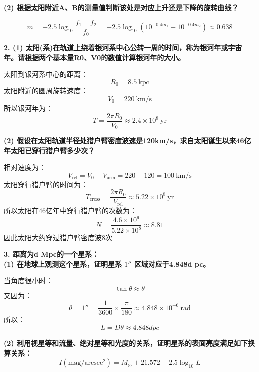 \documentclass{ctexart}
\begin{document}
\vspace{0.5em}

\noindent\textbf{(2) 根据太阳附近A、B的测量值判断该处是对应上升还是下降的旋转曲线？}

\vspace{0.25em}
\[m = -2.5 \log_{10}\frac{f_1 + f_2}{f_0} = -2.5 \log_{10}(10^{-0.4 m_1} + 10^{-0.4 m_2}) \approx 0.638\]
\vspace{0.5em}

\noindent\textbf{2. (1) 太阳(系)在轨道上绕着银河系中心公转一周的时间，称为银河年或宇宙年。请根据两个基本量R0、V0的数值计算银河年的大小。}

\vspace{0.25em}
\noindent 太阳到银河系中心的距离：
\[R_0 = 8.5\ \mathrm{kpc}\]
太阳附近的圆周旋转速度：
\[V_0 = 220\ \mathrm{km/s}\]
所以银河年为：
\[T = \frac{2 \pi R_0}{V_0} \approx 2.4 \times 10^8\ \mathrm{yr}\]
\vspace{0.5em}

\noindent\textbf{(2) 假设在太阳轨道半径处猎户臂密度波速是120km/s，求自太阳诞生以来46亿年太阳已穿行猎户臂多少次？}

\vspace{0.25em}
\noindent 相对速度为：
\[V_\mathrm{rel} = V_0 - V_\mathrm{arm} = 220 - 120 = 100\ \mathrm{km/s}\]
太阳穿行猎户臂的时间为：
\[T_\mathrm{cross} = \frac{2 \pi R_0}{V_\mathrm{rel}} \approx 5.22 \times 10^8\ \mathrm{yr}\]
所以太阳在46亿年中穿行猎户臂的次数为：
\[N = \frac{4.6 \times 10^9}{5.22 \times 10^8} \approx 8.81\]
因此太阳大约穿过猎户臂密度波8次
\vspace{0.5em}

\noindent\textbf{3. 距离为d Mpc的一个星系：\\
(1) 在地球上观测这个星系，证明星系 \(1''\) 区域对应于4.848d pc。}

\vspace{0.25em}
\noindent 当角度很小时：
\[\tan \theta \approx \theta\]
又因为：
\[\theta = 1'' = \frac{1}{3600} \times \frac{\pi}{180} \approx 4.848 \times 10^{-6}\ \mathrm{rad}\]
所以：
\[L = D \theta \approx 4.848d pc\]
\vspace{0.5em}

\noindent\textbf{(2) 利用视星等和流量、绝对星等和光度的关系，证明星系的表面亮度满足如下换算关系：
\[\boxed{
I(\mathrm{mag/arcsec^2})
=M_\odot+21.572-2.5\log_{10}L
}\]}
\end{document}
